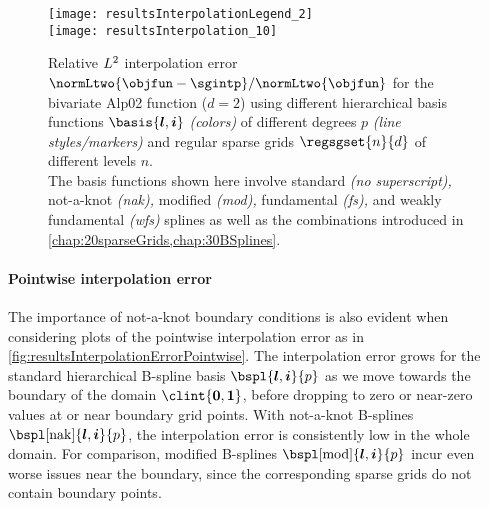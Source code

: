 \begin{SCfigure}
  \begin{minipage}{102mm}%
    \hspace*{8mm}%
    \texttt{[image: resultsInterpolationLegend\_2]}\\[2mm]%
    \texttt{[image: resultsInterpolation\_10]}%
  \end{minipage}%
  \caption[Relative interpolation error for different basis functions]{%
    Relative $L^2$ interpolation error
    $\normLtwo{\objfun - \sgintp}/\normLtwo{\objfun}$
    for the bivariate Alp02 function ($d = 2$)
    using different hierarchical basis functions
    $\basis{\*l,\*i}$ \emph{(colors)}
    of different degrees $p$ \emph{(line styles/markers)} and
    regular sparse grids $\regsgset{n}{d}$ of different levels $n$.\\
    The basis functions shown here involve
    standard \emph{(no superscript),}
    not-a-knot \emph{(nak),}
    modified \emph{(mod),}
    fundamental \emph{(fs),} and
    weakly fundamental \emph{(wfs)}
    splines as well as the combinations
    introduced in \cref{chap:20sparseGrids,chap:30BSplines}.%
  }%
  \label{fig:resultsInterpolationErrorBasisFunctions}%
\end{SCfigure}

\paragraph{Pointwise interpolation error}

The importance of not-a-knot boundary conditions is also evident
when considering plots of the pointwise interpolation error as in
\cref{fig:resultsInterpolationErrorPointwise}.
The interpolation error grows for the standard hierarchical
B-spline basis $\bspl{\*l,\*i}{p}$
as we move towards the boundary of the domain $\clint{\*0, \*1}$,
before dropping to zero or near-zero values at or near boundary grid points.
With not-a-knot B-splines $\bspl[\nak]{\*l,\*i}{p}$,
the interpolation error is consistently low in the whole domain.
For comparison, modified B-splines $\bspl[\modified]{\*l,\*i}{p}$
incur even worse issues near the boundary, since the corresponding sparse grids
do not contain boundary points.

